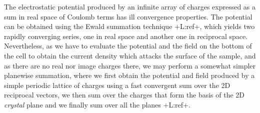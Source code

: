 \documentclass{article}
\newcommand{\notaL}[1]{{\color{blue}+L:#1+}}
\begin{document}
The electrostatic potential produced by an infinite array of
charges expressed as a sum in real space of Coulomb terms has ill
convergence properties. The potential can be obtained
using the Ewald summation technique \notaL{ref}, which yields two rapidly converging
series, one in real space and another one in reciprocal space.
Nevertheless, as we have to evaluate the potential and the field on
the bottom of the cell to obtain the current density which attacks the
surface of the sample, and as there are no
real nor image charges there, we may perform a somewhat simpler planewise
summation, where we first obtain the potential and field produced by a
simple periodic lattice of charges using a fast convergent sum over the 2D
reciprocal vectors, we then sum over the charges that form the basis
of the 2D {\em crystal} plane and we finally sum over all the planes \notaL{ref}.
\end{document}
